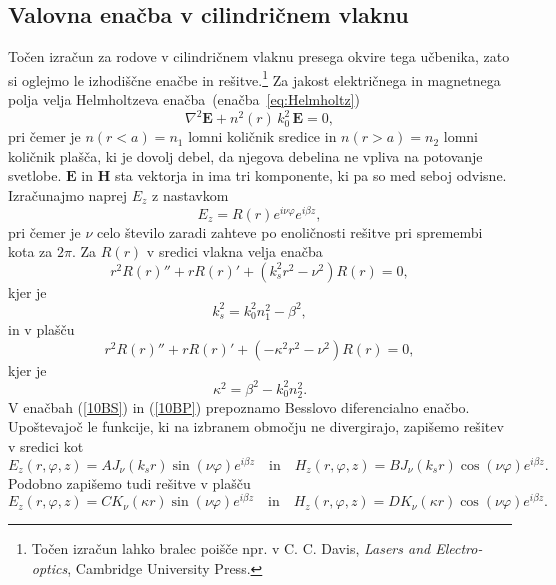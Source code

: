 \subsection*{Valovna enačba v cilindričnem vlaknu}
Točen izračun za rodove v cilindričnem vlaknu presega okvire tega učbenika, zato
si oglejmo le izhodiščne enačbe in rešitve.\footnote{Točen izračun lahko bralec poišče npr. v C. C. Davis, 
{\it Lasers and Electro-optics}, Cambridge University Press.} Za jakost električnega in magnetnega polja velja 
Helmholtzeva enačba~(enačba~\ref{eq:Helmholtz})
\begin{equation}
\nabla^2 \mathbf{E} + n^2(r)\, k_0^2\, \mathbf{E} = 0,
\end{equation}
pri čemer je $n(r<a)=n_1$ lomni količnik sredice in $n(r>a)=n_2$ 
lomni količnik plašča, ki je dovolj debel, da njegova debelina ne 
vpliva na potovanje svetlobe. $\mathbf{E}$ in $\mathbf{H}$ sta vektorja in ima
tri komponente, ki pa so med seboj odvisne. Izračunajmo naprej $E_z$ z nastavkom
\begin{equation}
E_z = R(r)e^{i \nu \varphi}e^{i \beta z},
\end{equation}
pri čemer je $\nu$ celo število zaradi zahteve po enoličnosti rešitve pri spremembi
kota za $2\pi$. Za $R(r)$ v sredici vlakna velja enačba
\begin{equation}
r^2 R(r)'' + r R(r)' + (k_s^2r^2 - \nu^2)R(r) = 0,
\label{10BS}
\end{equation}
kjer je 
\begin{equation}
k_s^2=k_0^2n_1^2- \beta^2,
\label{eq:ks}
\end{equation}
in v plašču
\begin{equation}
r^2 R(r)'' + r R(r)' + (-\kappa^2r^2 - \nu^2)R(r) = 0,
\label{10BP}
\end{equation}
kjer je 
\begin{equation}
\kappa^2=\beta^2-k_0^2n_2^2.
\end{equation}
V enačbah (\ref{10BS}) in (\ref{10BP}) prepoznamo Besslovo diferencialno enačbo. 
Upoštevajoč le funkcije, ki na izbranem območju ne divergirajo, zapišemo rešitev v sredici kot
\begin{equation}
E_z (r, \varphi, z) = A J_\nu(k_sr)\sin(\nu \varphi)e^{i \beta z} \quad  \mathrm{in} \quad 
H_z (r, \varphi, z) = B J_\nu(k_sr)\cos(\nu \varphi)e^{i \beta z}.
\end{equation}
Podobno zapišemo tudi rešitve v plašču
\begin{equation}
E_z (r, \varphi, z)= C K_\nu(\kappa r)\sin(\nu \varphi)e^{i \beta z} \quad \mathrm{in} \quad 
H_z (r, \varphi, z)= D K_\nu(\kappa r)\cos(\nu \varphi)e^{i \beta z}.
\end{equation}
